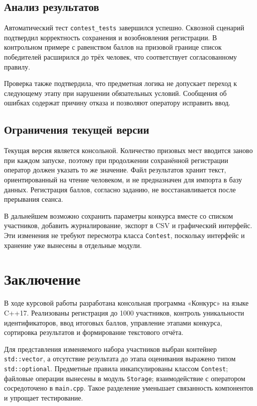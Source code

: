 \documentclass[14pt,a4paper]{extarticle}
\newcommand{\code}[1]{\texttt{#1}}
\begin{document}
\subsection{Анализ результатов}

Автоматический тест \code{contest\_tests} завершился успешно. Сквозной сценарий подтвердил корректность сохранения и возобновления регистрации. В контрольном примере с равенством баллов на призовой границе список победителей расширился до трёх человек, что соответствует согласованному правилу.

Проверка также подтвердила, что предметная логика не допускает переход к следующему этапу при нарушении обязательных условий. Сообщения об ошибках содержат причину отказа и позволяют оператору исправить ввод.

\subsection{Ограничения текущей версии}

Текущая версия является консольной. Количество призовых мест вводится заново при каждом запуске, поэтому при продолжении сохранённой регистрации оператор должен указать то же значение. Файл результатов хранит текст, ориентированный на чтение человеком, и не предназначен для импорта в базу данных. Регистрация баллов, согласно заданию, не восстанавливается после прерывания сеанса.

В дальнейшем возможно сохранить параметры конкурса вместе со списком участников, добавить журналирование, экспорт в CSV и графический интерфейс. Эти изменения не требуют пересмотра класса \code{Contest}, поскольку интерфейс и хранение уже вынесены в отдельные модули.

\clearpage
\section*{Заключение}

В ходе курсовой работы разработана консольная программа «Конкурс» на языке C++17. Реализованы регистрация до 1000 участников, контроль уникальности идентификаторов, ввод итоговых баллов, управление этапами конкурса, сортировка результатов и формирование текстового отчёта.

Для представления изменяемого набора участников выбран контейнер \code{std::vector}, а отсутствие результата до этапа оценивания выражено типом \code{std::optional}. Предметные правила инкапсулированы классом \code{Contest}; файловые операции вынесены в модуль \code{Storage}; взаимодействие с оператором сосредоточено в \code{main.cpp}. Такое разделение уменьшает связанность компонентов и упрощает тестирование.
\end{document}
